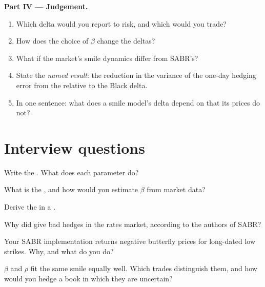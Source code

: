 \begin{problem}
\medskip\noindent\textbf{Part IV --- Judgement.}
\begin{enumerate}[resume]
\item Which delta would you report to risk, and which would you trade?
\item How does the choice of $\beta$ change the deltas?
\item What if the market's smile dynamics differ from SABR's?
\item State the \emph{named result}: the reduction in the variance of the one-day hedging error from the
 relative to the Black delta.
\item In one sentence: what does a smile model's delta depend on that its prices do not?
\end{enumerate}
\end{problem}

\section{Interview questions}

\begin{interviewq}\label{iq:dv:sabr-and-smile-dynamics:1}
Write the . What does each parameter do?
\end{interviewq}

\begin{interviewq}\label{iq:dv:sabr-and-smile-dynamics:2}
What is the , and how would you estimate $\beta$ from market data?
\end{interviewq}

\begin{interviewq}\label{iq:dv:sabr-and-smile-dynamics:3}
Derive the  in a .
\end{interviewq}

\begin{interviewq}\label{iq:dv:sabr-and-smile-dynamics:4}
Why did  give bad hedges in the rates market, according to the authors of SABR?
\end{interviewq}

\begin{interviewq}\label{iq:dv:sabr-and-smile-dynamics:5}
Your SABR implementation returns negative butterfly prices for long-dated low strikes. Why, and what do you do?
\end{interviewq}

\begin{interviewq}\label{iq:dv:sabr-and-smile-dynamics:6}
$\beta$ and $\rho$ fit the same smile equally well. Which trades distinguish them, and how would you hedge a book in
which they are uncertain?
\end{interviewq}
